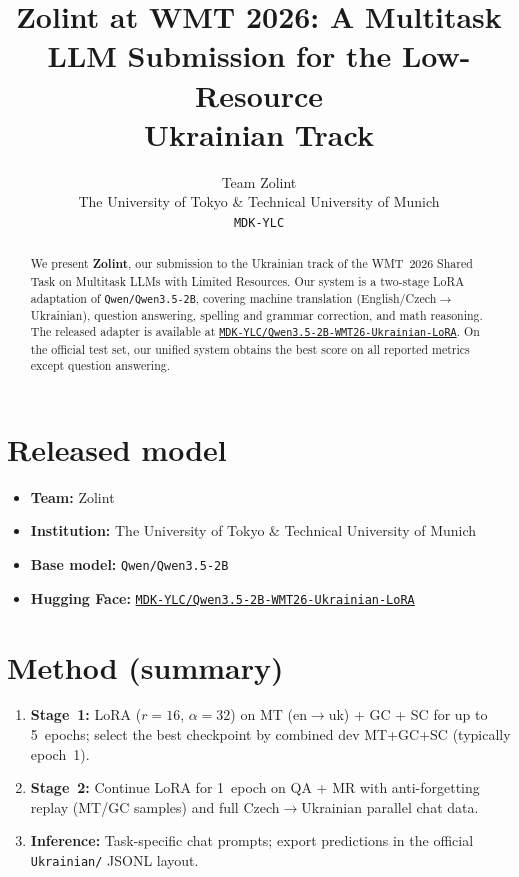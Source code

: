 \documentclass[11pt]{article}
\title{Zolint at WMT 2026: A Multitask LLM Submission for the Low-Resource\\
Ukrainian Track}
\author{
  Team Zolint\\
  The University of Tokyo \& Technical University of Munich\\
  \texttt{MDK-YLC}
}
\date{}
\begin{document}
\maketitle

\begin{abstract}
We present \textbf{Zolint}, our submission to the Ukrainian track of the
WMT~2026 Shared Task on Multitask LLMs with Limited Resources.
Our system is a two-stage LoRA adaptation of
\texttt{Qwen/Qwen3.5-2B}, covering machine translation (English/Czech$\to$Ukrainian),
question answering, spelling and grammar correction, and math reasoning.
The released adapter is available at
\href{https://huggingface.co/MDK-YLC/Qwen3.5-2B-WMT26-Ukrainian-LoRA}{\texttt{MDK-YLC/Qwen3.5-2B-WMT26-Ukrainian-LoRA}}.
On the official test set, our unified system obtains the best score on all
reported metrics except question answering.
\end{abstract}

\section{Released model}

\begin{itemize}
  \item \textbf{Team:} Zolint
  \item \textbf{Institution:} The University of Tokyo \& Technical University of Munich
  \item \textbf{Base model:} \texttt{Qwen/Qwen3.5-2B}
  \item \textbf{Hugging Face:}
  \href{https://huggingface.co/MDK-YLC/Qwen3.5-2B-WMT26-Ukrainian-LoRA}{\texttt{MDK-YLC/Qwen3.5-2B-WMT26-Ukrainian-LoRA}}
\end{itemize}

\section{Method (summary)}

\begin{enumerate}
  \item \textbf{Stage~1:} LoRA ($r{=}16$, $\alpha{=}32$) on MT (en$\to$uk) + GC + SC for up to 5~epochs;
  select the best checkpoint by combined dev MT+GC+SC (typically epoch~1).
  \item \textbf{Stage~2:} Continue LoRA for 1~epoch on QA + MR with anti-forgetting
  replay (MT/GC samples) and full Czech$\to$Ukrainian parallel chat data.
  \item \textbf{Inference:} Task-specific chat prompts; export predictions in the
  official \texttt{Ukrainian/} JSONL layout.
\end{enumerate}
\end{document}
